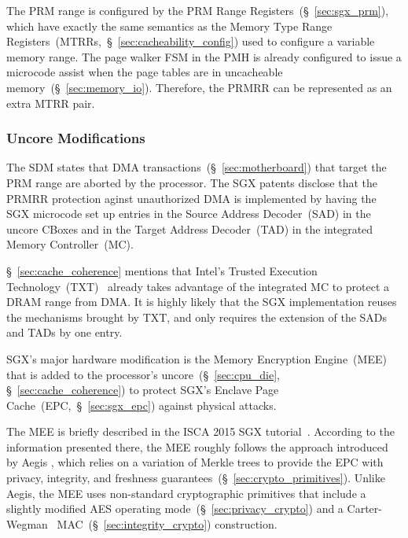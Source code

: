 The PRM range is configured by the PRM Range Registers~(\S~\ref{sec:sgx_prm}),
which have exactly the same semantics as the Memory Type Range
Registers~(MTRRs,~\S~\ref{sec:cacheability_config}) used to configure a
variable memory range. The page walker FSM in the PMH is already configured to
issue a microcode assist when the page tables are in uncacheable
memory~(\S~\ref{sec:memory_io}). Therefore, the PRMRR can be represented as an
extra MTRR pair.


\subsubsection{Uncore Modifications}
\label{sec:sgx_uncore_modifications}


The SDM states that DMA transactions~(\S~\ref{sec:motherboard}) that target the
PRM range are aborted by the processor. The SGX patents disclose that the PRMRR
protection aginst unauthorized DMA is implemented by having the SGX microcode
set up entries in the Source Address Decoder~(SAD) in the uncore CBoxes and in
the Target Address Decoder~(TAD) in the integrated Memory Controller~(MC).

\S~\ref{sec:cache_coherence} mentions that Intel's Trusted Execution
Technology~(TXT)~\cite{grawrock2009txt} already takes advantage of the
integrated MC to protect a DRAM range from DMA. It is highly likely that the
SGX implementation reuses the mechanisms brought by TXT, and only requires the
extension of the SADs and TADs by one entry.

SGX's major hardware modification is the Memory Encryption Engine~(MEE) that is
added to the processor's uncore~(\S~\ref{sec:cpu_die},
\S~\ref{sec:cache_coherence}) to protect SGX's Enclave Page
Cache~(EPC,~\S~\ref{sec:sgx_epc}) against physical attacks.


The MEE is briefly described in the ISCA 2015 SGX
tutorial~\cite{intel2015iscasgx}. According to the information presented there,
the MEE roughly follows the approach introduced by Aegis \cite{suh2003aegis}
\cite{aegis_impl}, which relies on a variation of Merkle trees to provide the
EPC with privacy, integrity, and freshness
guarantees~(\S~\ref{sec:crypto_primitives}). Unlike Aegis, the MEE uses
non-standard cryptographic primitives that include a slightly modified AES
operating mode~(\S~\ref{sec:privacy_crypto}) and a
Carter-Wegman~\cite{carter1977mac, wegman1981mac}
MAC~(\S~\ref{sec:integrity_crypto}) construction.

